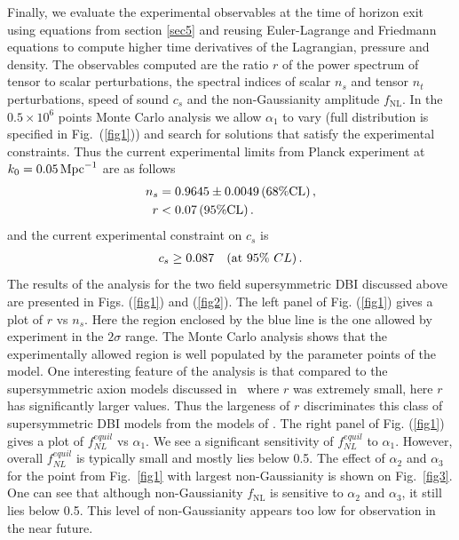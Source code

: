 \documentclass[a4paper,11pt]{article}
\def\non{\nonumber\\}
\def\non{\nonumber\\}
\begin{document}
  Finally, we evaluate the experimental observables at the time of horizon exit using equations from section \ref{sec5} and reusing Euler-Lagrange and Friedmann equations to compute higher time derivatives of the Lagrangian, pressure and density. The observables computed are the ratio $r$ of the power spectrum of tensor to scalar perturbations, the spectral indices of scalar $n_s$ and tensor $n_t$ perturbations, 
 speed of sound $c_s$ 
  and the non-Gaussianity amplitude $f_\text{NL}$.
    In the $0.5 \times 10^6$ points Monte Carlo analysis we allow $\alpha_1$ to vary
  (full distribution is specified in Fig.~(\ref{fig1}))
  and search for solutions that satisfy the experimental constraints. Thus the
  current experimental limits from Planck experiment at $k_0=0.05\, {\rm Mpc}^{-1}$ are as follows~\cite{Adam:2015rua,Ade:2015lrj,Array:2015xqh}
  \begin{align}
  	n_s& = 0.9645 \pm 0.0049\, (68\% {\rm CL})\,, \non
  	r & <0.07\, (95\% {\rm CL})\,.
  	\label{data}
  \end{align}
  and the current experimental constraint on $c_s$ is~\cite{Ade:2015lrj}
  \begin{align}
  	c_s\geq 0.087~~~({\rm at ~}95\% ~CL)\,.
  	\label{sound}
  \end{align}
  The results of the analysis for the two field supersymmetric DBI discussed above
  are presented in Figs. (\ref{fig1}) and (\ref{fig2}). The left panel of Fig. (\ref{fig1}) gives
  a plot of $r$ vs $n_s$. Here the region enclosed by the blue line is the one allowed by experiment in the $2\sigma$ range.
  The Monte Carlo analysis shows that the experimentally allowed region is well populated by the parameter points of the model.
  One interesting feature of the analysis is that compared to the
  supersymmetric axion models discussed in~\cite{Nath:2017ihp}
  where $r$ was extremely small, here $r$ has significantly
  larger values. Thus the largeness of $r$ discriminates this class of supersymmetric DBI models from the models
  of \cite{Nath:2017ihp}.
  The right panel of Fig. (\ref{fig1}) gives a plot of $f^{equil}_{NL}$ vs $\alpha_1$. We see a significant sensitivity
  of $f^{equil}_{NL}$ to $\alpha_1$. However, overall $f^{equil}_{NL}$ is typically small and mostly lies below 0.5. The effect of $\alpha_2$ and $\alpha_3$ for the point from Fig.~\ref{fig1} with largest non-Gaussianity is shown on Fig.~\ref{fig3}. One can see that although non-Gaussianity $f_\text{NL}$ is sensitive to $\alpha_2$ and $\alpha_3$, it still lies below 0.5. This level
  of non-Gaussianity appears too low for observation in the near future. 
  
\end{document}
